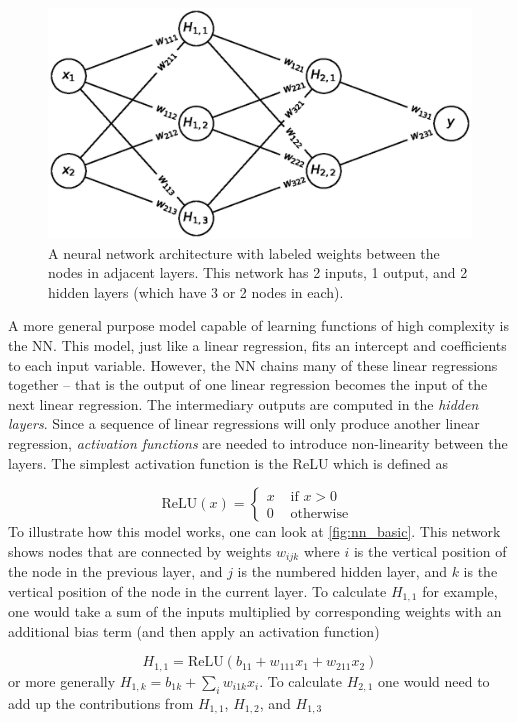 \begin{figure}
	\centering 
	\includegraphics[width=0.8\linewidth]{planning/images/nn_basic.eps}
	\caption{A neural network architecture with labeled weights between the nodes in adjacent layers. This network has 2 inputs, 1 output, and 2 hidden layers (which have 3 or 2 nodes in each).}
	\label{fig:nn_basic}
\end{figure}

A more general purpose model capable of learning functions of high complexity is the \gls{NN}. This model, just like a linear regression, fits an intercept and coefficients to each input variable. However, the \gls{NN} chains many of these linear regressions together -- that is the output of one linear regression becomes the input of the next linear regression. The intermediary outputs are computed in the \emph{hidden layers}. Since a sequence of linear regressions will only produce another linear regression, \emph{activation functions} are needed to introduce non-linearity between the layers. The simplest activation function is the \gls{ReLU} which is defined as

\begin{equation}
	\text{ReLU}(x) =
	\begin{cases}
	 x &\text{ if } x > 0 \\
	 0 &\text{ otherwise }
	\end{cases}
\end{equation}  
To illustrate how this model works, one can look at \autoref{fig:nn_basic}. This network shows nodes that are connected by weights $w_{ijk}$ where $i$ is the vertical position of the node in the previous layer, and $j$ is the numbered hidden layer, and $k$ is the vertical position of the node in the current layer. To calculate $H_{1,1}$ for example, one would take a sum of the inputs multiplied by corresponding weights with an additional bias term (and then apply an activation function)

\begin{equation}
	H_{1,1} = \text{ReLU}(b_{11} + w_{111} x_1 + w_{211} x_2)
\end{equation}
or more generally $H_{1,k} = b_{1k} + \sum_{i} w_{i1k} x_i$. To calculate $H_{2,1}$ one would need to add up the contributions from $H_{1,1}$, $H_{1, 2}$, and $H_{1, 3}$

